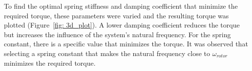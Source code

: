         To find the optimal spring stiffness and damping coefficient that minimize the required torque, these parameters were varied and the resulting torque was plotted (Figure~\ref{fig: 3d_plot}). A lower damping coefficient reduces the torque but increases the influence of the system's natural frequency. For the spring constant, there is a specific value that minimizes the torque. It was observed that selecting a spring constant that makes the natural frequency close to \(\omega_{rotor}\) minimizes the required torque.